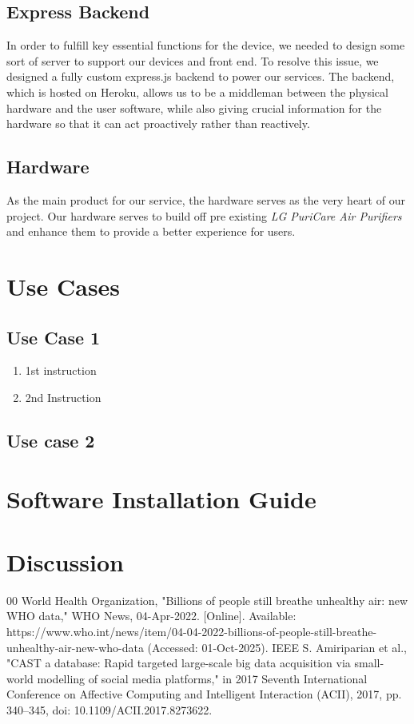 \documentclass[conference]{IEEEtran}
\begin{document}
    \subsection{Express Backend}
        In order to fulfill key essential functions for the device, we needed to design some sort of server to support our devices and front end. To resolve this issue, we designed a fully custom express.js backend to power our services. The backend, which is hosted on Heroku, allows us to be a middleman between the physical hardware and the user software, while also giving crucial information for the hardware so that it can act proactively rather than reactively.
    \subsection{Hardware}
        As the main product for our service, the hardware serves as the very heart of our project. Our hardware serves to build off pre existing \textit{LG PuriCare Air Purifiers} and enhance them to provide a better experience for users. 

\section{Use Cases}
    \subsection{Use Case 1}
        \begin{enumerate}
            \item 1st instruction
            \item 2nd Instruction
        \end{enumerate}
    \subsection{Use case 2}
\section{Software Installation Guide}

\section{Discussion}

\begin{thebibliography}{00}
  World Health Organization, "Billions of people still breathe unhealthy air: new WHO data," WHO News, 04-Apr-2022. [Online]. Available: https://www.who.int/news/item/04-04-2022-billions-of-people-still-breathe-unhealthy-air-new-who-data  (Accessed: 01-Oct-2025).
 IEEE S. Amiriparian et al., "CAST a database: Rapid targeted large-scale big data acquisition via small-world modelling of social media platforms," in 2017 Seventh International Conference on Affective Computing and Intelligent Interaction (ACII), 2017, pp. 340–345, doi: 10.1109/ACII.2017.8273622.

\end{thebibliography}
\vspace{12pt}
\end{document}
